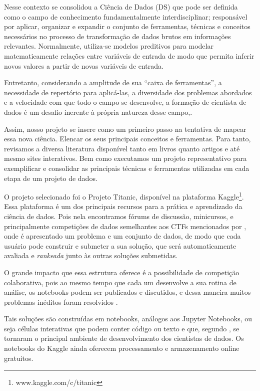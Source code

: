 \documentclass{article}
\begin{document}
Nesse contexto se consolidou a Ciência de Dados (DS) que pode ser definida como o campo de conhecimento fundamentalmente interdisciplinar; responsável por aplicar, organizar e expandir o conjunto de ferramentas, técnicas e conceitos necessários no processo de transformação de dados brutos em informações relevantes. 
Normalmente, utiliza-se modelos preditivos para modelar matematicamente relações entre variáveis de entrada de modo que permita inferir novos valores a partir de novas variáveis de entrada.  

Entretanto, considerando a amplitude de sua “caixa de ferramentas”, a necessidade de repertório para aplicá-las, a diversidade dos problemas abordados e a velocidade com que todo o campo se desenvolve, a formação de cientista de dados é um desafio inerente à própria natureza desse campo,\cite{BATON,DONOHO}.

Assim, nosso projeto se insere como um primeiro passo na tentativa de mapear essa nova ciência. Elencar os seus principais conceitos e ferramentas. 
Para tanto, revisamos a diversa literatura disponível tanto em livros quanto artigos e até mesmo sites interativos. Bem como executamos um projeto representativo para exemplificar e consolidar as principais técnicas e ferramentas utilizadas em cada etapa de um projeto de dados. 

O projeto selecionado foi o Projeto Titanic, disponível na plataforma Kaggle\footnote{www.kaggle.com/c/titanic}.
Essa plataforma é um dos principais recursos para a prática e aprendizado da ciência de dados. Pois nela encontramos fórums de discussão, minicursos, e principalmente competições de dados semelhantes aos CTFs mencionados por \cite{DONOHO}, onde é apresentado um problema e um conjunto de dados, de modo que cada usuário pode construir e submeter a sua solução, que será automaticamente avaliada e \textit{rankeada} junto às outras soluções submetidas. 

O grande impacto que essa estrutura oferece é a possibilidade de competição colaborativa, pois ao mesmo tempo que cada um desenvolve a sua rotina de análise, os notebooks podem ser publicados e discutidos, e dessa maneira muitos problemas inéditos foram resolvidos \cite{KAGGLE_OPPORTUNITY,KAGGLEgraham2015,KAGGLEiglovikov2017,KAGGLEnarayanan2011,KAGGLEpuurula2014,KAGGLEtaieb2014,KAGGLEyang2018}. 

Tais soluções são construídas em notebooks, análogos aos Jupyter Notebooks, ou seja células interativas que podem conter código ou texto e que, segundo \cite{BATON}, se tornaram o principal ambiente de desenvolvimento dos cientistas de dados. Os notebooks do Kaggle ainda oferecem processamento e armazenamento online gratuitos.
\end{document}
